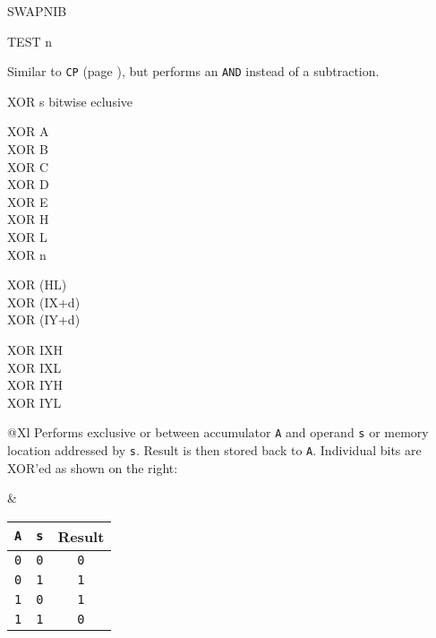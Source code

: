 \begin{basedescript}{
	\desclabelstyle{\multilinelabel}
	\desclabelwidth{3cm}}
\begin{DetailItem}{SWAPNIB\ZXN}
	\end{DetailItem}

	\begin{DetailItem}{TEST n\ZXN}
		{}
		{\SymTEST}

		Similar to {\tt CP} (page \pageref{DetailRefCP}), but performs an {\tt AND} instead of a subtraction.

		\begin{DetailEffects}[p]
			\FlagsTESTn
		\end{DetailEffects}
						
		\begin{DetailTiming}
		\end{DetailTiming}

	\end{DetailItem}

	\pagebreak
	\begin{DetailItem}{XOR s}
		{bitwise eclusive }
		{}

		\begin{DetailVariants}
			XOR A\\
			XOR B\\
			XOR C\\
			XOR D\\
			XOR E\\
			XOR H\\
			XOR L\\
			XOR n

			\columnbreak
			XOR (HL)\\
			XOR (IX+d)\\
			XOR (IY+d)

			\columnbreak
			XOR IXH\UNDOC\\
			XOR IXL\UNDOC\\
			XOR IYH\UNDOC\\
			XOR IYL\UNDOC
		\end{DetailVariants}
		
		\begin{tabularx}{\linewidth}{@{}Xl}
			Performs exclusive or between accumulator {\tt A} and operand {\tt s} or memory location addressed by {\tt s}. Result is then stored back to {\tt A}. Individual bits are XOR'ed as shown on the right:
	
			&

			\begin{tabular}[t]{cc|c}
				{\tt A} & {\tt s} & Result \\
				\hline
				{\tt 0} & {\tt 0} & {\tt 0} \\
				{\tt 0} & {\tt 1} & {\tt 1} \\
				{\tt 1} & {\tt 0} & {\tt 1} \\
				{\tt 1} & {\tt 1} & {\tt 0} \\
			\end{tabular}


\end{tabularx}
\end{DetailItem}
\end{basedescript}
